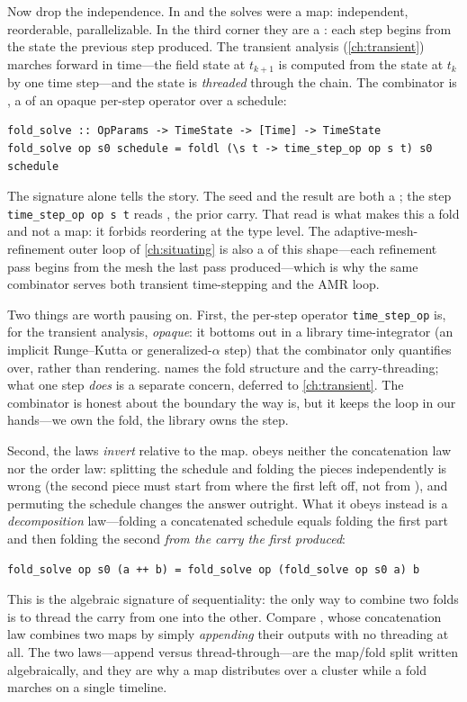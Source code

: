 Now drop the independence. In  and  the
solves were a map: independent, reorderable, parallelizable. In the third corner
they are a : each step begins from the state the previous step produced.
The transient analysis (\cref{ch:transient}) marches forward in time---the field
state at $t_{k+1}$ is computed from the state at $t_k$ by one time step---and the
state is \emph{threaded} through the chain. The combinator is ,
a  of an opaque per-step operator over a schedule:
\begin{lstlisting}[style=l4style]
fold_solve :: OpParams -> TimeState -> [Time] -> TimeState
fold_solve op s0 schedule = foldl (\s t -> time_step_op op s t) s0 schedule
\end{lstlisting}
The signature alone tells the story. The seed  and the result are both a
; the step \lstinline[style=l4style]|time_step_op op s t| reads
, the prior carry. That read is what makes this a fold and not a map: it
forbids reordering at the type level. The adaptive-mesh-refinement outer loop of
\cref{ch:situating} is also a  of this shape---each refinement
pass begins from the mesh the last pass produced---which is why the same combinator
serves both transient time-stepping and the AMR loop.

Two things are worth pausing on. First, the per-step operator
\lstinline[style=l4style]|time_step_op| is, for the transient analysis,
\emph{opaque}: it bottoms out in a library time-integrator (an implicit Runge--Kutta
or generalized-$\alpha$ step) that the combinator only quantifies over, rather than
rendering.  names the fold structure and the carry-threading; what
one step \emph{does} is a separate concern, deferred to \cref{ch:transient}. The
combinator is honest about the boundary the way  is, but it keeps the
loop in our hands---we own the fold, the library owns the step.

Second, the laws \emph{invert} relative to the map.  obeys
neither the concatenation law nor the order law: splitting the schedule and folding
the pieces independently is wrong (the second piece must start from where the first
left off, not from ), and permuting the schedule changes the answer
outright. What it obeys instead is a \emph{decomposition} law---folding a
concatenated schedule equals folding the first part and then folding the second
\emph{from the carry the first produced}:
\begin{lstlisting}[style=l4style]
fold_solve op s0 (a ++ b) = fold_solve op (fold_solve op s0 a) b
\end{lstlisting}
This is the algebraic signature of sequentiality: the only way to combine two folds
is to thread the carry from one into the other. Compare , whose
concatenation law combines two maps by simply \emph{appending} their outputs with no
threading at all. The two laws---append versus thread-through---are the map/fold
split written algebraically, and they are why a map distributes over a cluster while
a fold marches on a single timeline.


